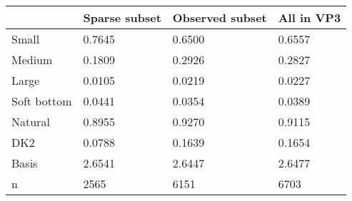 \begin{tabular}{llll}
\toprule
 & Sparse subset & Observed subset & All in VP3 \\
\midrule
Small & 0.7645 & 0.6500 & 0.6557 \\
Medium & 0.1809 & 0.2926 & 0.2827 \\
Large & 0.0105 & 0.0219 & 0.0227 \\
Soft bottom & 0.0441 & 0.0354 & 0.0389 \\
Natural & 0.8955 & 0.9270 & 0.9115 \\
DK2 & 0.0788 & 0.1639 & 0.1654 \\
Basis & 2.6541 & 2.6447 & 2.6477 \\
n & 2565 & 6151 & 6703 \\
\bottomrule
\end{tabular}
